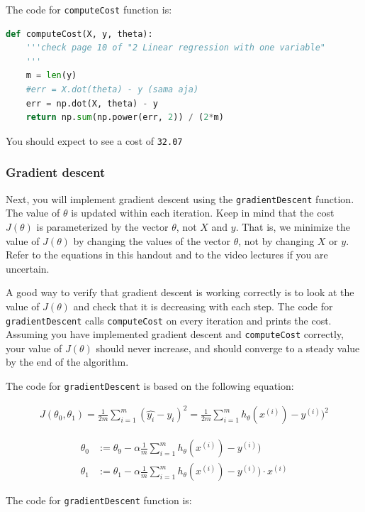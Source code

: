 \documentclass{article}
\begin{document}
The code for \texttt{computeCost} function is:

\begin{lstlisting}[language=Python]
def computeCost(X, y, theta):
    '''check page 10 of "2 Linear regression with one variable"
    '''
    m = len(y)
    #err = X.dot(theta) - y (sama aja)
    err = np.dot(X, theta) - y
    return np.sum(np.power(err, 2)) / (2*m)
\end{lstlisting}

You should expect to see a cost of \texttt{32.07}

\subsubsection{Gradient descent}
Next, you will implement gradient descent using the \texttt{gradientDescent} function. The value of $\theta$ is updated within each iteration. Keep in mind that the cost $J(\theta)$ is parameterized by the vector $\theta$, not $X$ and $y$. That is, we minimize the value of $J(\theta)$ by changing the values of the vector $\theta$, not by changing $X$ or $y$. Refer to the equations in this handout and to the video lectures if you are uncertain.

A good way to verify that gradient descent is working correctly is to look at the value of $J(\theta)$ and check that it is decreasing with each step. The code for \texttt{gradientDescent} calls \texttt{computeCost} on every iteration and prints the cost. Assuming you have implemented gradient descent and \texttt{computeCost} correctly, your value of $J(\theta)$ should never increase, and should converge to a steady value by the end of the algorithm.

The code for \texttt{gradientDescent} is based on the following equation:

\begin{align}
    J(\theta_0, \theta_1) = \frac{1}{2m}\sum_{i=1}^m{(\hat{y_i}-y_i)^2} = \frac{1}{2m}\sum_{i=1}^m{h_\theta(x^{(i)})-y^{(i)})^2}
\end{align}

\begin{align}
  \theta_0 & := \theta_9 - \alpha\frac{1}{m}\sum_{i=1}^m{h_\theta(x^{(i)})-y^{(i)})}\\
  \theta_1 & := \theta_1 - \alpha\frac{1}{m}\sum_{i=1}^m{h_\theta(x^{(i)})-y^{(i)})}\cdot x^{(i)}
\end{align}

The code for \texttt{gradientDescent} function is:
\end{document}

